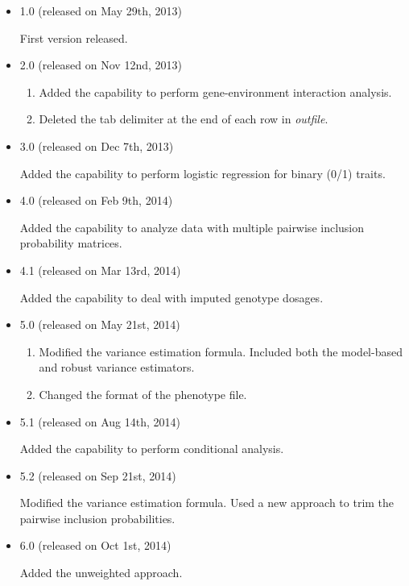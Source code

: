 \documentclass[12pt,letter]{article}
\begin{document}
\begin{itemize}
\item 1.0 (released on May 29th, 2013)

First version released.

\item 2.0 (released on Nov 12nd, 2013)

\begin{enumerate}
\item Added the capability to perform gene-environment interaction analysis.
\item Deleted the tab delimiter at the end of each row in {\it outfile}.
\end{enumerate}

\item 3.0 (released on Dec 7th, 2013)

Added the capability to perform logistic regression for binary (0/1) traits.

\item 4.0 (released on Feb 9th, 2014)

Added the capability to analyze data with multiple pairwise inclusion probability matrices.

\item 4.1 (released on Mar 13rd, 2014)

Added the capability to deal with imputed genotype dosages.

\item 5.0 (released on May 21st, 2014)

\begin{enumerate}
\item Modified the variance estimation formula. 
Included both the model-based and robust variance estimators.
\item Changed the format of the phenotype file. 
\end{enumerate}

\item 5.1 (released on Aug 14th, 2014)

Added the capability to perform conditional analysis.

\item 5.2 (released on Sep 21st, 2014)

Modified the variance estimation formula. Used a new approach to trim the pairwise inclusion
probabilities.

\item 6.0 (released on Oct 1st, 2014)

Added the unweighted approach.


\end{itemize}
\end{document}
